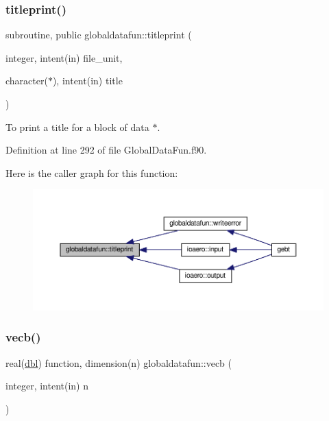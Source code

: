 \subsubsection{\texorpdfstring{titleprint()}{titleprint()}}
{\footnotesize\ttfamily subroutine, public globaldatafun\+::titleprint (\begin{DoxyParamCaption}\item[{integer, intent(in)}]{file\+\_\+unit,  }\item[{character($\ast$), intent(in)}]{title }\end{DoxyParamCaption})}



To print a title for a block of data $\ast$. 



Definition at line 292 of file Global\+Data\+Fun.\+f90.

Here is the caller graph for this function\+:\nopagebreak
\begin{figure}[H]
\begin{center}
\leavevmode
\includegraphics[width=350pt]{namespaceglobaldatafun_a74b07978d9a6c644031fbb37b131f609_icgraph}
\end{center}
\end{figure}
\mbox{\label{namespaceglobaldatafun_a0ef3145b88a5e2f7679e5309ed885bc4}} 
\subsubsection{\texorpdfstring{vecb()}{vecb()}}
{\footnotesize\ttfamily real(\hyperlink{namespaceglobaldatafun_a5008801201dd34f2af8eae07756befb4}{dbl}) function, dimension(n) globaldatafun\+::vecb (\begin{DoxyParamCaption}\item[{integer, intent(in)}]{n }\end{DoxyParamCaption})\hspace{0.3cm}{\ttfamily [private]}}



